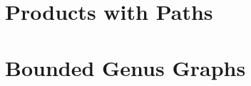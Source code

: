 \documentclass{patmorin}
\DeclareMathOperator{\pth}{path}
\begin{document}
%
%
%
%
%

\section{Products with Paths}

\section{Bounded Genus Graphs}




\end{document}
